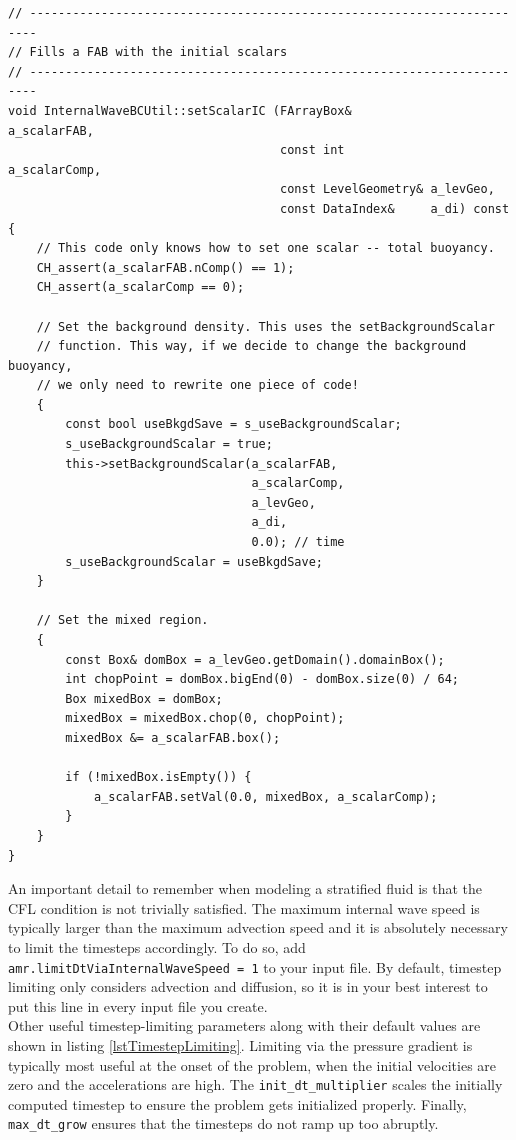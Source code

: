 \documentclass[12pt]{article}
\begin{document}
\begin{lstlisting}[caption={A recommended update to avoid code duplication.},label=lstSetBkgdScalOnce]
// -----------------------------------------------------------------------
// Fills a FAB with the initial scalars
// -----------------------------------------------------------------------
void InternalWaveBCUtil::setScalarIC (FArrayBox&           a_scalarFAB,
                                      const int            a_scalarComp,
                                      const LevelGeometry& a_levGeo,
                                      const DataIndex&     a_di) const
{
    // This code only knows how to set one scalar -- total buoyancy.
    CH_assert(a_scalarFAB.nComp() == 1);
    CH_assert(a_scalarComp == 0);

    // Set the background density. This uses the setBackgroundScalar
    // function. This way, if we decide to change the background buoyancy,
    // we only need to rewrite one piece of code!
    {
        const bool useBkgdSave = s_useBackgroundScalar;
        s_useBackgroundScalar = true;
        this->setBackgroundScalar(a_scalarFAB,
                                  a_scalarComp,
                                  a_levGeo,
                                  a_di,
                                  0.0); // time
        s_useBackgroundScalar = useBkgdSave;
    }

    // Set the mixed region.
    {
        const Box& domBox = a_levGeo.getDomain().domainBox();
        int chopPoint = domBox.bigEnd(0) - domBox.size(0) / 64;
        Box mixedBox = domBox;
        mixedBox = mixedBox.chop(0, chopPoint);
        mixedBox &= a_scalarFAB.box();

        if (!mixedBox.isEmpty()) {
            a_scalarFAB.setVal(0.0, mixedBox, a_scalarComp);
        }
    }
}
\end{lstlisting}

An important detail to remember when modeling a stratified fluid is that the CFL condition is not trivially satisfied. The maximum internal wave speed is typically larger than the maximum advection speed and it is absolutely necessary to limit the timesteps accordingly. To do so, add \texttt{amr.limitDtViaInternalWaveSpeed = 1} to your input file. By default, timestep limiting only considers advection and diffusion, so it is in your best interest to put this line in every input file you create.\\

Other useful timestep-limiting parameters along with their default values are shown in listing \ref{lstTimestepLimiting}. Limiting via the pressure gradient is typically most useful at the onset of the problem, when the initial velocities are zero and the accelerations are high. The \texttt{init\_dt\_multiplier} scales the initially computed timestep to ensure the problem gets initialized properly. Finally, \texttt{max\_dt\_grow} ensures that the timesteps do not ramp up too abruptly.
\end{document}
